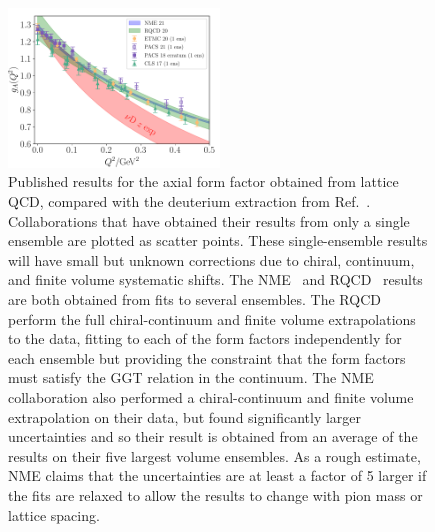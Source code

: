 \begin{figure}[hbt!]
\centering
\includegraphics[width=0.5\textwidth]{plots/gaq2-overlay-standalone.pdf}
\vspace{10pt}
\caption{
Published results for the axial form factor obtained from lattice QCD,
 compared with the deuterium extraction from Ref.~\cite{Meyer:2016oeg}.
Collaborations that have obtained their results from only a single ensemble
 are plotted as scatter points.
These single-ensemble results will have small but unknown corrections due to chiral, continuum,
 and finite volume systematic shifts.
The NME~\cite{Park:2021ypf} and RQCD~\cite{RQCD:2019jai}
 results are both obtained from fits to several ensembles.
The RQCD perform the full chiral-continuum and finite volume extrapolations to the data,
 fitting to each of the form factors independently for each ensemble but providing
 the constraint that the form factors must satisfy the GGT relation in the continuum.
The NME collaboration also performed a chiral-continuum and finite volume extrapolation
 on their data, but found significantly larger uncertainties and so their result
 is obtained from an average of the results on their five largest volume ensembles.
As a rough estimate, NME claims that the uncertainties are at least a factor of 5 larger
 if the fits are relaxed to allow the results to change with pion mass or lattice spacing.
 }
\label{fig:gaq2_overlay}
\end{figure}

